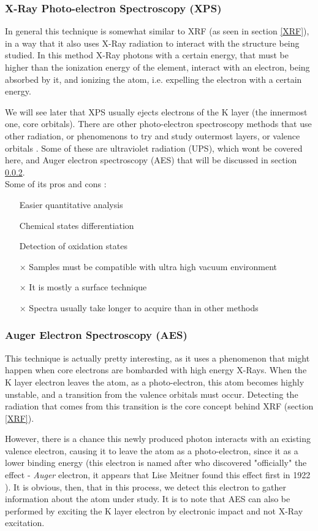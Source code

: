 \documentclass[]{article}
\begin{document}
\subsubsection{X-Ray Photo-electron Spectroscopy (XPS)} \label{XPS}
In general this technique is somewhat similar to XRF (as seen in section \ref{XRF}), in a way that it also uses X-Ray radiation to interact with the structure being studied. In this method X-Ray photons with a certain energy, that must be higher than the ionization energy of the element, interact with an electron, being absorbed by it, and ionizing the atom, i.e. expelling the electron with a certain energy.
\par We will see later that XPS usually ejects electrons of the K layer (the innermost one, core orbitals). There are other photo-electron spectroscopy methods that use other radiation, or phenomenons  to try and study outermost layers, or valence orbitals \cite{JMH_Modern}. Some of these are ultraviolet radiation (UPS), which wont be covered here, and Auger electron spectroscopy (AES) that will be discussed in section \ref{AES}.\\

Some of its pros and cons \cite{CL_XPS}:
\begin{itemize}
\item[\checkmark] Easier quantitative analysis
\item[\checkmark] Chemical states differentiation
\item[\checkmark] Detection of oxidation states
\item[$\times$] Samples must be compatible with ultra high vacuum environment
\item[$\times$] It is mostly a surface technique
\item[$\times$] Spectra usually take longer to acquire than in other methods
\end{itemize}

\subsubsection{Auger Electron Spectroscopy (AES)} \label{AES}
This technique is actually pretty interesting, as it uses a phenomenon that might happen when core electrons are bombarded with high energy X-Rays. When the K layer electron leaves the atom, as a photo-electron, this atom becomes highly unstable, and a transition from the valence orbitals must occur. Detecting the radiation that comes from this transition is the core concept behind XRF (section \ref{XRF}). 
\par However, there is a chance this newly produced photon interacts with an existing valence electron, causing it to leave the atom as a photo-electron, since it as a lower binding energy (this electron is named after who discovered "officially" the effect - \textit{Auger} electron, it appears that Lise Meitner found this effect first in 1922 \cite{AU_Wiki}). It is obvious, then, that in this process, we detect this electron to gather information about the atom under study. It is to note that AES can also be performed by exciting the K layer electron by electronic impact and not X-Ray excitation.\\
\end{document}
